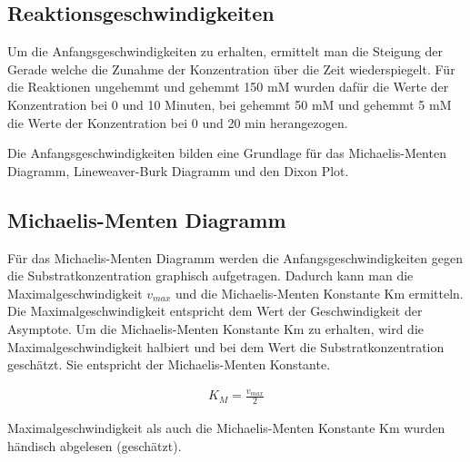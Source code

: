 \subsection{Reaktionsgeschwindigkeiten}
Um die Anfangsgeschwindigkeiten zu erhalten, ermittelt man die Steigung der Gerade  welche die Zunahme der Konzentration über die Zeit wiederspiegelt. Für die Reaktionen ungehemmt und gehemmt 150 mM wurden dafür die Werte der Konzentration bei 0 und 10 Minuten, bei gehemmt 50 mM und gehemmt 5 mM die Werte der Konzentration bei 0 und 20 min herangezogen.




Die Anfangsgeschwindigkeiten bilden eine Grundlage für das Michaelis-Menten Diagramm, Lineweaver-Burk Diagramm und den Dixon Plot. 


\subsection{Michaelis-Menten Diagramm}

Für das Michaelis-Menten Diagramm werden die Anfangsgeschwindigkeiten gegen die Substratkonzentration graphisch aufgetragen. Dadurch kann man die Maximalgeschwindigkeit $v_{max}$ und die Michaelis-Menten Konstante Km ermitteln.
\\
Die Maximalgeschwindigkeit entspricht dem Wert der Geschwindigkeit der Asymptote. 
Um die Michaelis-Menten Konstante Km zu erhalten, wird die Maximalgeschwindigkeit halbiert und bei dem Wert die Substratkonzentration geschätzt. Sie entspricht der Michaelis-Menten Konstante. 

\begin{align}
  K_M = \frac{v_{max}}{2}
\end{align}

Maximalgeschwindigkeit als auch die Michaelis-Menten Konstante Km wurden händisch abgelesen (geschätzt).

